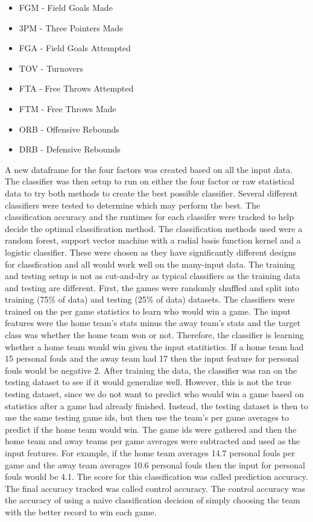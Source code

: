 \documentclass[12pt]{article}%
\begin{document}
\begin{itemize}
\item FGM - Field Goals Made
\item 3PM - Three Pointers Made
\item FGA - Field Goals Attempted
\item TOV - Turnovers
\item FTA - Free Throws Attempted
\item FTM - Free Throws Made
\item ORB - Offensive Rebounds
\item DRB - Defensive Rebounds
\end{itemize}

A new dataframe for the four factors was created based on all the input data. The classifier was then setup to run on either the four factor or raw statistical data to try both methods to create the best possible classifier.
\newline\newline
Several different classifiers were tested to determine which may perform the best. The classification accuracy and the runtimes for each classifer were tracked to help decide the optimal classification method. The classification methods used were a random forest, support vector machine with a radial basis function kernel and a logistic classifier. These were chosen as they have significantly different designs for classfication and all would work well on the many-input data.
\newline\newline
The training and testing setup is not as cut-and-dry as typical classifiers as the training data and testing are different. First, the games were randomly shuffled and split into training (75\% of data) and testing (25\% of data) datasets. The classifiers were trained on the per game statistics to learn who would win a game. The input features were the home team's stats minus the away team's stats and the target class was whether the home team won or not. Therefore, the classifier is learning whether a home team would win given the input statitistics. If a home team had 15 personal fouls and the away team had 17 then the input feature for personal fouls would be negative 2. After training the data, the classifier was ran on the testing dataset to see if it would generalize well. However, this is not the true testing dataset, since we do not want to predict who would win a game based on statistics after a game had already finished. Instead, the testing dataset is then to use the same testing game ids, but then use the team's per game averages to predict if the home team would win. The game ids were gathered and then the home team and away teams per game averages were subtracted and used as the input features. For example, if the home team averages 14.7 personal fouls per game and the away team averages 10.6 personal fouls then the input for personal fouls would be 4.1. The score for this classification was called prediction accuracy. The final accuracy tracked was called control accuracy. The control accuracy was the accuracy of using a naive classification decision of simply choosing the team with the better record to win each game.
\end{document}

